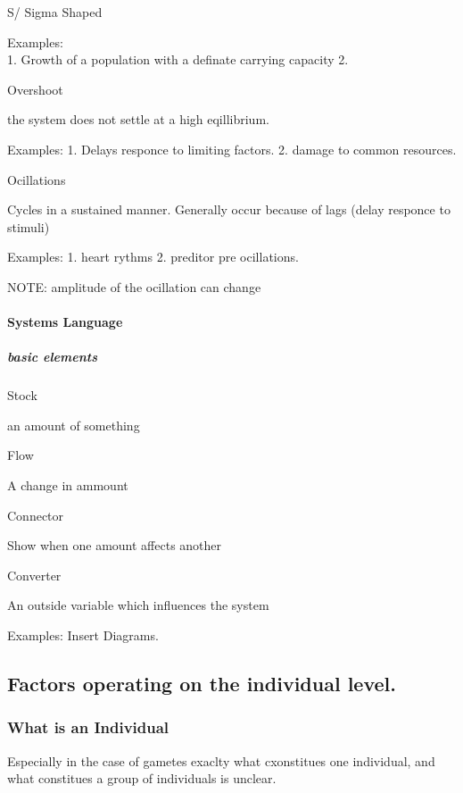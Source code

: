 \documentclass[]{article}
\let\oldparagraph\paragraph
\renewcommand{\paragraph}[1]{\oldparagraph{#1}\mbox{}}
\let\oldsubparagraph\subparagraph
\renewcommand{\subparagraph}[1]{\oldsubparagraph{#1}\mbox{}}
\begin{document}
S/ Sigma Shaped

Examples:\\
1. Growth of a population with a definate carrying capacity 2.

Overshoot

the system does not settle at a high eqillibrium.

Examples: 1. Delays responce to limiting factors. 2. damage to common
resources.

Ocillations

Cycles in a sustained manner. Generally occur because of lags (delay
responce to stimuli)

Examples: 1. heart rythms 2. preditor pre ocillations.

NOTE: amplitude of the ocillation can change

\hypertarget{systems-language}{%
\paragraph{Systems Language}\label{systems-language}}

\hypertarget{basic-elements}{%
\subparagraph{basic elements}\label{basic-elements}}

Stock

an amount of something

Flow

A change in ammount

Connector

Show when one amount affects another

Converter

An outside variable which influences the system

Examples: Insert Diagrams.

\hypertarget{factors-operating-on-the-individual-level.}{%
\subsection{Factors operating on the individual
level.}\label{factors-operating-on-the-individual-level.}}

\hypertarget{what-is-an-individual}{%
\subsubsection{What is an Individual}\label{what-is-an-individual}}

Especially in the case of gametes exaclty what cxonstitues one
individual, and what constitues a group of individuals is unclear.
\end{document}
